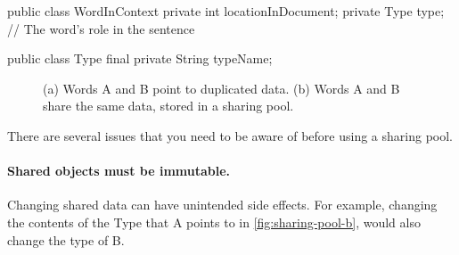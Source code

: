 \begin{shortlisting}
public class WordInContext {
	private int  locationInDocument;
	private Type type;  // The word's role in the sentence
}

public class Type {
	final private String typeName;
}
\end{shortlisting}


\begin{figure}
\centering
	\hspace{0.18\textwidth}
    \caption{(a) Words A and B point to duplicated data. (b) Words A and B
    share the same data, stored in a sharing pool.}
	\label{fig:sharing-pool}
\end{figure}


There are several issues that you need to be aware of before using a sharing
pool.
\paragraph{Shared objects must be immutable.} Changing shared data can
have unintended side effects. For example, 
changing the contents of the Type that A points to in
\autoref{fig:sharing-pool-b}, would also change the type of B.

